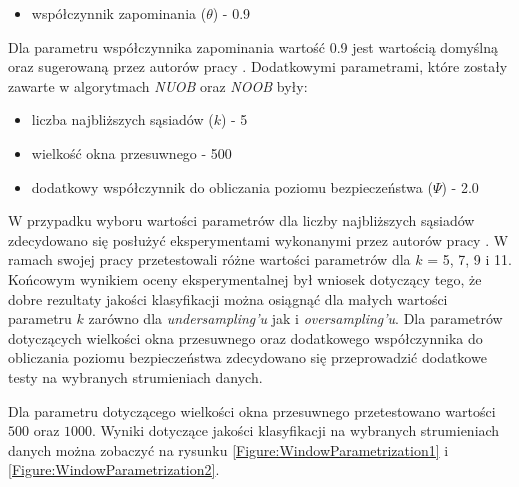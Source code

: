 \begin{itemize}
    \item współczynnik zapominania ($\theta$) - 0.9
\end{itemize}

\noindent Dla parametru współczynnika zapominania wartość 0.9 jest wartością domyślną oraz sugerowaną przez autorów pracy \cite{Article:OBSecond}. Dodatkowymi parametrami, które zostały zawarte w algorytmach \textit{NUOB} oraz \textit{NOOB} były:

\begin{itemize}
    \item liczba najbliższych sąsiadów ($k$) - 5
    \item wielkość okna przesuwnego - 500
    \item dodatkowy współczynnik do obliczania poziomu bezpieczeństwa ($\Psi$) - 2.0
\end{itemize}

\noindent W przypadku wyboru wartości parametrów dla liczby najbliższych sąsiadów zdecydowano się posłużyć eksperymentami wykonanymi przez autorów pracy \cite{Article:NNBag}. W ramach swojej pracy przetestowali różne wartości parametrów dla $k$ = 5, 7, 9 i 11. Końcowym wynikiem oceny eksperymentalnej był wniosek dotyczący tego, że dobre rezultaty jakości klasyfikacji można osiągnąć dla małych wartości parametru $k$ zarówno dla \textit{undersampling'u} jak i \textit{oversampling'u}. Dla parametrów dotyczących wielkości okna przesuwnego oraz dodatkowego współczynnika do obliczania poziomu bezpieczeństwa zdecydowano się przeprowadzić dodatkowe testy na wybranych strumieniach danych.

Dla parametru dotyczącego wielkości okna przesuwnego przetestowano wartości $500$ oraz $1000$. Wyniki dotyczące jakości klasyfikacji na wybranych strumieniach danych można zobaczyć na rysunku \ref{Figure:WindowParametrization1} i \ref{Figure:WindowParametrization2}.

